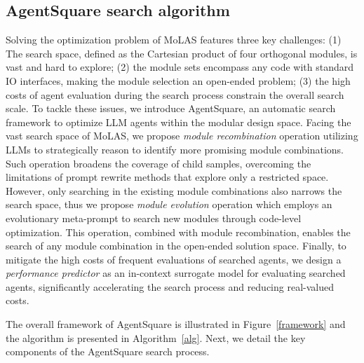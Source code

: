 \subsection{AgentSquare search algorithm}
Solving the optimization problem of MoLAS features three key challenges: (1) The search space, defined as the Cartesian product of four orthogonal modules, is vast and hard to explore;
(2) the module sets encompass any code with standard IO interfaces, making the module selection an open-ended problem; (3) the high costs of agent evaluation during the search process constrain the overall search scale.
To tackle these issues, we introduce AgentSquare, an automatic search framework to optimize LLM agents within the modular design space. 
Facing the vast search space of MoLAS, we propose \emph{module recombination} operation utilizing LLMs to strategically reason to identify more promising module combinations.
Such operation broadens the coverage of child samples, overcoming the limitations of prompt rewrite methods that explore only a restricted space.
However, only searching in the existing module combinations also narrows the search space, thus we propose \emph{module evolution} operation which employs an evolutionary meta-prompt to search new modules through code-level optimization.
This operation, combined with module recombination, enables the search of any module combination in the open-ended solution space.
Finally, to mitigate the high costs of frequent evaluations of searched agents, we design a \emph{performance predictor} as an in-context surrogate model for evaluating searched agents, significantly accelerating the search process and reducing real-valued costs.

The overall framework of AgentSquare is illustrated in Figure~\ref{framework} and the algorithm is presented in Algorithm~\ref{alg}. 
Next, we detail the key components of the AgentSquare search process.

